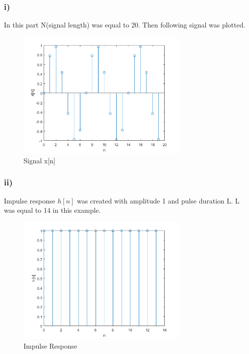 \documentclass[letterpaper,12pt]{article}
\begin{document}
\subsubsection{i)}
In this part N(signal length) was equal to 20. Then following signal was plotted.
\begin{figure}[H]
    \centering
    \includegraphics[width = 0.75\textwidth]{i.png}
    \caption{Signal x[n]}
    \end{figure} 
    
\subsubsection{ii)}
Impulse response \(h[n]\) was created with amplitude 1 and pulse duration L. L was equal to 14 in this example.
\begin{figure}[H]
    \centering
    \includegraphics[width = 0.75\textwidth]{i2.png}
    \caption{Impulse Response}
    \end{figure} 
    
\end{document}
